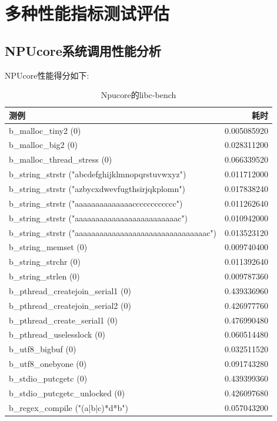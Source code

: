 \section{多种性能指标测试评估}

\subsection{NPUcore系统调用性能分析}

NPUcore性能得分如下:

\begin{table}
    \centering
    \begin{tabular}{|l|r|}
        \hline
        测例 & 耗时 \\
        \hline
        b\_malloc\_tiny2 (0) & 0.005085920 \\
        \hline
        b\_malloc\_big2 (0) & 0.028311200 \\
        \hline
        b\_malloc\_thread\_stress (0) & 0.066339520 \\
        \hline
        b\_string\_strstr ("abcdefghijklmnopqrstuvwxyz") & 0.011712000 \\
        \hline
        b\_string\_strstr ("azbycxdwevfugthsirjqkplomn") & 0.017838240 \\
        \hline
        b\_string\_strstr ("aaaaaaaaaaaaaacccccccccccc") & 0.011262640 \\
        \hline
        b\_string\_strstr ("aaaaaaaaaaaaaaaaaaaaaaaaac") & 0.010942000 \\
        \hline
        b\_string\_strstr ("aaaaaaaaaaaaaaaaaaaaaaaaaaaaaaaac") & 0.013523120 \\
        \hline
        b\_string\_memset (0) & 0.009740400 \\
        \hline
        b\_string\_strchr (0) & 0.011392640 \\
        \hline
        b\_string\_strlen (0) & 0.009787360 \\
        \hline
        b\_pthread\_createjoin\_serial1 (0) & 0.439336960 \\
        \hline
        b\_pthread\_createjoin\_serial2 (0) & 0.426977760 \\
        \hline
        b\_pthread\_create\_serial1 (0) & 0.476990480 \\
        \hline
        b\_pthread\_uselesslock (0) & 0.060514480 \\
        \hline
        b\_utf8\_bigbuf (0) & 0.032511520 \\
        \hline
        b\_utf8\_onebyone (0) & 0.091743280 \\
        \hline
        b\_stdio\_putcgetc (0) & 0.439399360 \\
        \hline
        b\_stdio\_putcgetc\_unlocked (0) & 0.426097680 \\
        \hline
        b\_regex\_compile ("(a|b|c)*d*b") & 0.057043200 \\
        \hline
    \end{tabular}
    \caption{Npucore的libc-bench}
\end{table}

